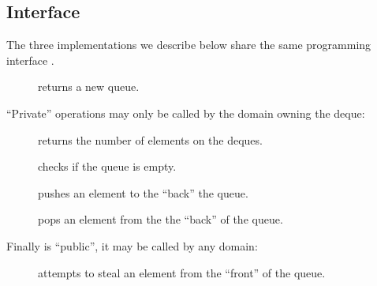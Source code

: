 \subsection{Interface}

The three  implementations we describe below share the same programming interface . \\

\begin{description}
\item[] returns a new queue.
\end{description}

\noindent ``Private'' operations may only be called by the domain owning the deque:
\begin{description}
\item[] returns the number of elements on the deques.

\item[] checks if the queue is empty.

\item[] pushes an element to the ``back'' the queue.

\item[] pops an element from the the ``back'' of the queue.
\end{description}

\noindent Finally  is ``public'', it may be called by any domain:
\begin{description}
\item[] attempts to steal
  an element from the ``front'' of the queue.
\end{description}
